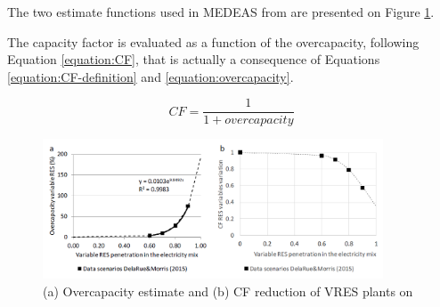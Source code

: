 The two estimate functions used in MEDEAS \cite{medeas-eroi} from \cite{delarue} are presented on Figure \ref{fig:vres-overcapacities}.

The capacity factor is evaluated as a function of the overcapacity, following Equation \ref{equation:CF}, that is actually a consequence of Equations \ref{equation:CF-definition} and \ref{equation:overcapacity}.

\begin{equation}
    CF=\frac{1}{1+overcapacity}
    \label{equation:CF}
\end{equation}

\begin{figure}[h]
    \includegraphics[width=0.9\textwidth]{resources/images/vres-impact-estimate.png}
    \caption{(a) Overcapacity estimate and (b) CF reduction of VRES plants on \cite{medeas-eroi}}
    \label{fig:vres-overcapacities}
\end{figure}